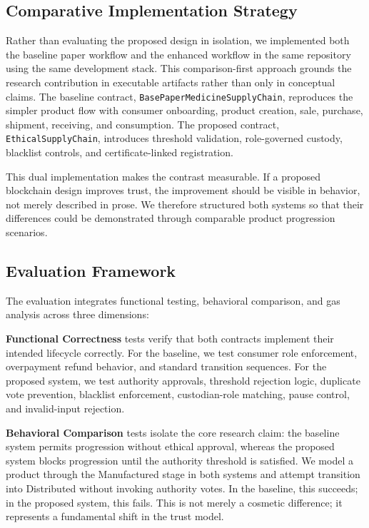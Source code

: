 \documentclass[conference]{IEEEtran}
\begin{document}
\subsection{Comparative Implementation Strategy}

Rather than evaluating the proposed design in isolation, we implemented both the baseline paper workflow and the enhanced workflow in the same repository using the same development stack. This comparison-first approach grounds the research contribution in executable artifacts rather than only in conceptual claims. The baseline contract, \texttt{BasePaperMedicineSupplyChain}, reproduces the simpler product flow with consumer onboarding, product creation, sale, purchase, shipment, receiving, and consumption. The proposed contract, \texttt{EthicalSupplyChain}, introduces threshold validation, role-governed custody, blacklist controls, and certificate-linked registration.

This dual implementation makes the contrast measurable. If a proposed blockchain design improves trust, the improvement should be visible in behavior, not merely described in prose. We therefore structured both systems so that their differences could be demonstrated through comparable product progression scenarios.

\subsection{Evaluation Framework}

The evaluation integrates functional testing, behavioral comparison, and gas analysis across three dimensions:

\textbf{Functional Correctness} tests verify that both contracts implement their intended lifecycle correctly. For the baseline, we test consumer role enforcement, overpayment refund behavior, and standard transition sequences. For the proposed system, we test authority approvals, threshold rejection logic, duplicate vote prevention, blacklist enforcement, custodian-role matching, pause control, and invalid-input rejection.

\textbf{Behavioral Comparison} tests isolate the core research claim: the baseline system permits progression without ethical approval, whereas the proposed system blocks progression until the authority threshold is satisfied. We model a product through the Manufactured stage in both systems and attempt transition into Distributed without invoking authority votes. In the baseline, this succeeds; in the proposed system, this fails. This is not merely a cosmetic difference; it represents a fundamental shift in the trust model.
\end{document}
